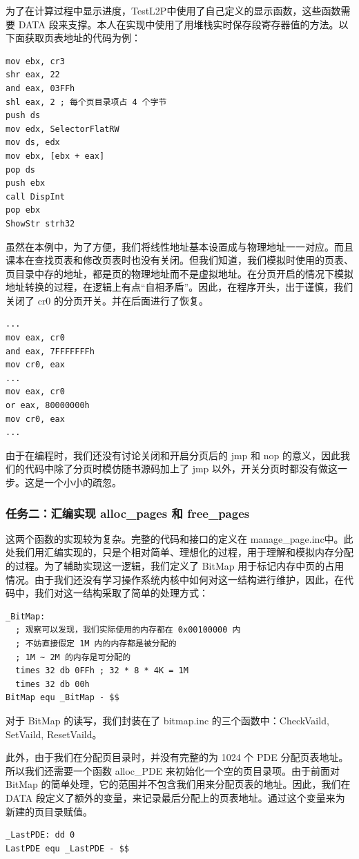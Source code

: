 \documentclass[UTF8,12pt]{ctexart}
\begin{document}
    为了在计算过程中显示进度，TestL2P中使用了自己定义的显示函数，这些函数需要 DATA 段来支撑。本人在实现中使用了用堆栈实时保存段寄存器值的方法。以下面获取页表地址的代码为例：
    \begin{lstlisting}[language={[x86masm]Assembler}]
mov ebx, cr3
shr eax, 22
and eax, 03FFh
shl eax, 2 ; 每个页目录项占 4 个字节
push ds
mov edx, SelectorFlatRW
mov ds, edx
mov ebx, [ebx + eax]
pop ds
push ebx
call DispInt
pop ebx
ShowStr strh32
    \end{lstlisting}
    虽然在本例中，为了方便，我们将线性地址基本设置成与物理地址一一对应。而且课本在查找页表和修改页表时也没有关闭。但我们知道，我们模拟时使用的页表、页目录中存的地址，都是页的物理地址而不是虚拟地址。在分页开启的情况下模拟地址转换的过程，在逻辑上有点“自相矛盾”。因此，在程序开头，出于谨慎，我们关闭了 cr0 的分页开关。并在后面进行了恢复。
    \begin{lstlisting}[language={[x86masm]Assembler}]
...
mov eax, cr0
and eax, 7FFFFFFFh
mov cr0, eax
...
mov eax, cr0
or eax, 80000000h
mov cr0, eax
...
    \end{lstlisting}
    由于在编程时，我们还没有讨论关闭和开启分页后的 jmp 和 nop 的意义，因此我们的代码中除了分页时模仿随书源码加上了 jmp 以外，开关分页时都没有做这一步。这是一个小小的疏忽。
    
    \subsubsection{任务二：汇编实现 alloc\_pages 和 free\_pages}
    这两个函数的实现较为复杂。完整的代码和接口的定义在 manage\_page.inc中。此处我们用汇编实现的，只是个相对简单、理想化的过程，用于理解和模拟内存分配的过程。为了辅助实现这一逻辑，我们定义了 BitMap 用于标记内存中页的占用情况。由于我们还没有学习操作系统内核中如何对这一结构进行维护，因此，在代码中，我们对这一结构采取了简单的处理方式：
    \begin{lstlisting}[language={[x86masm]Assembler}]
_BitMap: 
  ; 观察可以发现，我们实际使用的内存都在 0x00100000 内
  ; 不妨直接假定 1M 内的内存都是被分配的
  ; 1M ~ 2M 的内存是可分配的
  times 32 db 0FFh ; 32 * 8 * 4K = 1M
  times 32 db 00h
BitMap equ _BitMap - $$
    \end{lstlisting}
    
    对于 BitMap 的读写，我们封装在了 bitmap.inc 的三个函数中：CheckVaild, SetVaild, ResetVaild。

    此外，由于我们在分配页目录时，并没有完整的为 1024 个 PDE 分配页表地址。所以我们还需要一个函数 alloc\_PDE 来初始化一个空的页目录项。由于前面对 BitMap 的简单处理，它的范围并不包含我们用来分配页表的地址。因此，我们在 DATA 段定义了额外的变量，来记录最后分配上的页表地址。通过这个变量来为新建的页目录赋值。
    \begin{lstlisting}[language={[x86masm]Assembler}]
_LastPDE: dd 0
LastPDE equ _LastPDE - $$
    \end{lstlisting}
    
\end{document}

